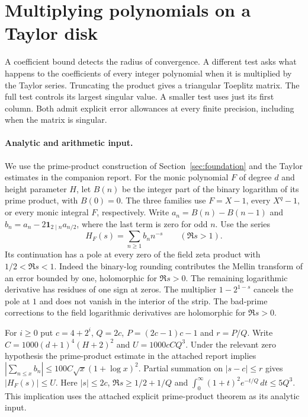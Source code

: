 \section{Multiplying polynomials on a Taylor disk}\label{sec:hardy-toeplitz}

A coefficient bound detects the radius of convergence. A different test asks what happens to the coefficients of every integer polynomial when it is multiplied by the Taylor series. Truncating the product gives a triangular Toeplitz matrix. The full test controls its largest singular value. A smaller test uses just its first column. Both admit explicit error allowances at every finite precision, including when the matrix is singular.

\paragraph{Analytic and arithmetic input.}
We use the prime-product construction of Section~\ref{sec:foundation} and the Taylor estimates in the companion report. For the monic polynomial $F$ of degree $d$ and height parameter $H$, let $B(n)$ be the integer part of the binary logarithm of its prime product, with $B(0)=0$. The three families use $F=X-1$, every $X^q-1$, or every monic integral $F$, respectively. Write $a_n=B(n)-B(n-1)$ and $b_n=a_n-2\mathbf1_{2\mid n}a_{n/2}$, where the last term is zero for odd $n$. Use the series
\[
 H_F(s)=\sum_{n\ge1} b_n n^{-s}\qquad(\Re s>1).
\]
Its continuation has a pole at every zero of the field zeta product with $1/2<\Re s<1$. Indeed the binary-log rounding contributes the Mellin transform of an error bounded by one, holomorphic for $\Re s>0$. The remaining logarithmic derivative has residues of one sign at zeros. The multiplier $1-2^{1-s}$ cancels the pole at $1$ and does not vanish in the interior of the strip. The bad-prime corrections to the field logarithmic derivatives are holomorphic for $\Re s>0$.

For $i\ge0$ put $c=4+2^i$, $Q=2c$, $P=(2c-1)c-1$ and $r=P/Q$. Write $C=1000(d+1)^4(H+2)^2$ and $U=1000cCQ^3$. Under the relevant zero hypothesis the prime-product estimate in the attached report implies $|\sum_{n\le x}b_n|\le 100C\sqrt{x}(1+\log x)^2$. Partial summation on $|s-c|\le r$ gives $|H_F(s)|\le U$. Here $|s|\le2c$, $\Re s\ge1/2+1/Q$ and
$\int_0^\infty(1+t)^2 e^{-t/Q}\,dt\le5Q^3$. This implication uses the attached explicit prime-product theorem as its analytic input.

